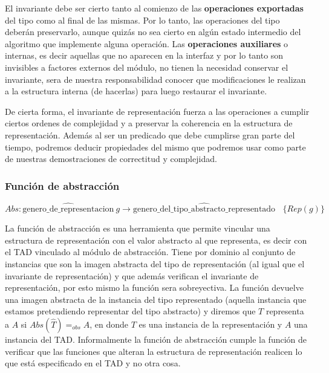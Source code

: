 \documentclass[10pt, a4paper]{report}
\begin{document}
El invariante debe ser cierto tanto al comienzo de las \textbf{operaciones exportadas} del tipo como al final de las mismas. Por lo tanto, las operaciones del tipo deber\'an preservarlo, aunque quiz\'as no sea cierto en alg\'un estado intermedio del algoritmo que implemente alguna operaci\'on. Las \textbf{operaciones auxiliares} o internas, es decir aquellas que no aparecen en la interfaz y por lo tanto son invisibles a factores externos del m\'odulo, no tienen la necesidad conservar el invariante, sera de nuestra responsabilidad conocer que modificaciones le realizan a la estructura interna (de hacerlas) para luego restaurar el invariante.

De cierta forma, el invariante de representaci\'on fuerza a las operaciones a cumplir ciertos ordenes de complejidad y a preservar la coherencia en la estructura de representaci\'on. Adem\'as al ser un predicado que debe cumplirse gran parte del tiempo, podremos deducir propiedades del mismo que podremos usar como parte de nuestras demostraciones de correctitud y complejidad.

\subsubsection{Funci\'on de abstracci\'on}

\begin{equation*}
 Abs: \widehat{\text{genero\_de\_representacion}}\ g \rightarrow \widehat{\text{genero\_del\_tipo\_abstracto\_representado}} \ \ \ \ \{Rep(g)\}
\end{equation*}

La funci\'on de abstracci\'on es una herramienta que permite vincular una estructura de representaci\'on con el valor abstracto al que representa, es decir con el TAD vinculado al m\'odulo de abstracci\'on. Tiene por dominio al conjunto de instancias que son la imagen abstracta del tipo de representaci\'on (al igual que el invariante de representaci\'on) y que adem\'as verifican el invariante de representaci\'on, por esto mismo la funci\'on sera sobreyectiva. La funci\'on devuelve una imagen abstracta de la instancia del tipo representado (aquella instancia que estamos pretendiendo representar del tipo abstracto) y diremos que $T$ representa a $A$ si $Abs(\widehat{T})=_{obs} A$, en donde $T$ es una instancia de la representaci\'on y $A$ una instancia del TAD. Informalmente la funci\'on de abstracci\'on cumple la funci\'on de verificar que las funciones que alteran la estructura de representaci\'on realicen lo que est\'a especificado en el TAD y no otra cosa.
\end{document}
